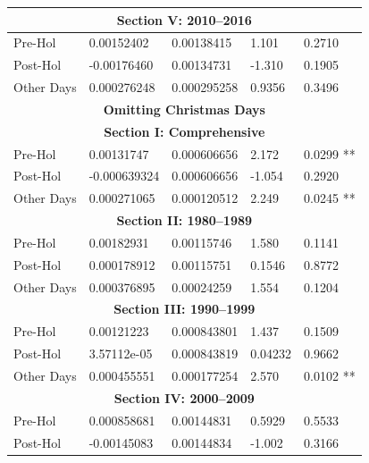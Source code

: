 \documentclass[11pt, english]{article}
\begin{document}
\begin{center}
\begin{longtable}{p{2cm}p{2cm}p{2cm}p{2cm}p{2cm}}
                \hline 
                \multicolumn{5}{c}{\textbf{Section V: 2010--2016}}\\   
                \hline            
                Pre-Hol & 0.00152402 & 0.00138415 & 1.101 & 0.2710\\ 
                Post-Hol & -0.00176460 & 0.00134731 & -1.310 & 0.1905\\  
                Other Days & 0.000276248 & 0.000295258 & 0.9356 & 0.3496\\
		\hline 
                \hline                                          
                \multicolumn{5}{c}{\textbf{Omitting Christmas Days}}\\ 
                \hline
                \hline
                \multicolumn{5}{c}{\textbf{Section I: Comprehensive}}\\
                \hline
                Pre-Hol & 0.00131747 & 0.000606656 & 2.172 & 0.0299 **\\
                Post-Hol & -0.000639324 & 0.000606656 & -1.054 & 0.2920\\
                Other Days & 0.000271065 & 0.000120512 & 2.249 & 0.0245 **\\
                \hline
                \multicolumn{5}{c}{\textbf{Section II: 1980--1989}}\\
                \hline
                Pre-Hol & 0.00182931 & 0.00115746 & 1.580 & 0.1141\\
                Post-Hol & 0.000178912 & 0.00115751 & 0.1546 & 0.8772\\  
                Other Days & 0.000376895 & 0.00024259 & 1.554 & 0.1204\\
                \hline 
                \multicolumn{5}{c}{\textbf{Section III: 1990--1999}}\\   
                \hline            
                Pre-Hol & 0.00121223 & 0.000843801 & 1.437 & 0.1509\\ 
                Post-Hol & 3.57112e-05 & 0.000843819 & 0.04232 & 0.9662\\  
                Other Days & 0.000455551 & 0.000177254 & 2.570 & 0.0102 **\\
                \hline 
                \multicolumn{5}{c}{\textbf{Section IV: 2000--2009}}\\
                \hline                                          
                Pre-Hol & 0.000858681 & 0.00144831 & 0.5929 & 0.5533\\
                Post-Hol & -0.00145083 & 0.00144834 & -1.002 & 0.3166\\  

\end{longtable}
\end{center}
\end{document}
